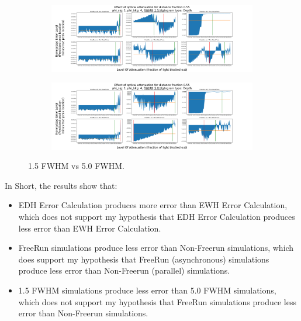\documentclass[aspectratio=169]{beamer}
\begin{document}
\begin{frame}
  \begin{figure}[H]
    \centering
    \begin{subfigure}[b]{0.75\textwidth}
      \includegraphics[width=1\linewidth]{1.5Example.png}
      \label{fig:1.5Example}
    \end{subfigure}
    \begin{subfigure}[b]{0.75\textwidth}
      \includegraphics[width=1\linewidth]{5.0Example.png}
      \label{fig:5.0Example}
    \end{subfigure}
    \caption{\label{fig:pulseComparison}\color{Blue}1.5 FWHM vs 5.0 FWHM.}
  \end{figure}
\end{frame}

\begin{frame}
\end{frame}

\begin{frame}
  In Short, the results show that:
  \begin{itemize}
    \color{Blue}
  \item EDH Error Calculation produces more error than EWH Error Calculation, which does not support my hypothesis that EDH Error Calculation produces less error than EWH Error Calculation.
  \item FreeRun simulations produce less error than Non-Freerun simulations, which does support my hypothesis that FreeRun (asynchronous) simulations produce less error than Non-Freerun (parallel) simulations.
  \item 1.5 FWHM simulations produce less error than 5.0 FWHM simulations, which does not support my hypothesis that FreeRun simulations produce less error than Non-Freerun simulations.
  \end{itemize}
\end{frame}
\end{document}
